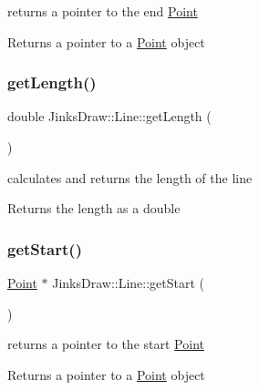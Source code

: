 returns a pointer to the end \mbox{\hyperlink{class_jinks_draw_1_1_point}{Point}} 

\begin{DoxyReturn}{Returns}
a pointer to a \mbox{\hyperlink{class_jinks_draw_1_1_point}{Point}} object 
\end{DoxyReturn}
\mbox{\label{class_jinks_draw_1_1_line_aeb77107e932c68b88be7e32344db1de4}} 
\subsubsection{\texorpdfstring{get\+Length()}{getLength()}}
{\footnotesize\ttfamily double Jinks\+Draw\+::\+Line\+::get\+Length (\begin{DoxyParamCaption}{ }\end{DoxyParamCaption})}



calculates and returns the length of the line 

\begin{DoxyReturn}{Returns}
the length as a double 
\end{DoxyReturn}
\mbox{\label{class_jinks_draw_1_1_line_a0457130d0cee09aa589c387cd7ed4b59}} 
\subsubsection{\texorpdfstring{get\+Start()}{getStart()}}
{\footnotesize\ttfamily \mbox{\hyperlink{class_jinks_draw_1_1_point}{Point}} $\ast$ Jinks\+Draw\+::\+Line\+::get\+Start (\begin{DoxyParamCaption}{ }\end{DoxyParamCaption})}



returns a pointer to the start \mbox{\hyperlink{class_jinks_draw_1_1_point}{Point}} 

\begin{DoxyReturn}{Returns}
a pointer to a \mbox{\hyperlink{class_jinks_draw_1_1_point}{Point}} object 
\end{DoxyReturn}
\mbox{\label{class_jinks_draw_1_1_line_a159d4850578aff530064d53c7461fa03}} 
